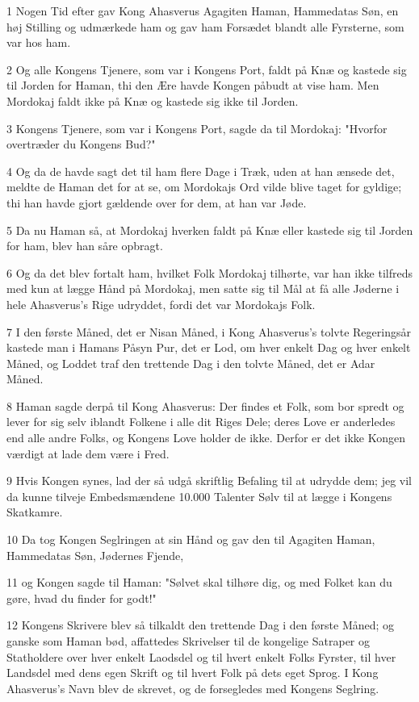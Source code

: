 \par 1 Nogen Tid efter gav Kong Ahasverus Agagiten Haman, Hammedatas Søn, en høj Stilling og udmærkede ham og gav ham Forsædet blandt alle Fyrsterne, som var hos ham.
\par 2 Og alle Kongens Tjenere, som var i Kongens Port, faldt på Knæ og kastede sig til Jorden for Haman, thi den Ære havde Kongen påbudt at vise ham. Men Mordokaj faldt ikke på Knæ og kastede sig ikke til Jorden.
\par 3 Kongens Tjenere, som var i Kongens Port, sagde da til Mordokaj: "Hvorfor overtræder du Kongens Bud?"
\par 4 Og da de havde sagt det til ham flere Dage i Træk, uden at han ænsede det, meldte de Haman det for at se, om Mordokajs Ord vilde blive taget for gyldige; thi han havde gjort gældende over for dem, at han var Jøde.
\par 5 Da nu Haman så, at Mordokaj hverken faldt på Knæ eller kastede sig til Jorden for ham, blev han såre opbragt.
\par 6 Og da det blev fortalt ham, hvilket Folk Mordokaj tilhørte, var han ikke tilfreds med kun at lægge Hånd på Mordokaj, men satte sig til Mål at få alle Jøderne i hele Ahasverus's Rige udryddet, fordi det var Mordokajs Folk.
\par 7 I den første Måned, det er Nisan Måned, i Kong Ahasverus's tolvte Regeringsår kastede man i Hamans Påsyn Pur, det er Lod, om hver enkelt Dag og hver enkelt Måned, og Loddet traf den trettende Dag i den tolvte Måned, det er Adar Måned.
\par 8 Haman sagde derpå til Kong Ahasverus: Der findes et Folk, som bor spredt og lever for sig selv iblandt Folkene i alle dit Riges Dele; deres Love er anderledes end alle andre Folks, og Kongens Love holder de ikke. Derfor er det ikke Kongen værdigt at lade dem være i Fred.
\par 9 Hvis Kongen synes, lad der så udgå skriftlig Befaling til at udrydde dem; jeg vil da kunne tilveje Embedsmændene 10.000 Talenter Sølv til at lægge i Kongens Skatkamre.
\par 10 Da tog Kongen Seglringen at sin Hånd og gav den til Agagiten Haman, Hammedatas Søn, Jødernes Fjende,
\par 11 og Kongen sagde til Haman: "Sølvet skal tilhøre dig, og med Folket kan du gøre, hvad du finder for godt!"
\par 12 Kongens Skrivere blev så tilkaldt den trettende Dag i den første Måned; og ganske som Haman bød, affattedes Skrivelser til de kongelige Satraper og Statholdere over hver enkelt Laodsdel og til hvert enkelt Folks Fyrster, til hver Landsdel med dens egen Skrift og til hvert Folk på dets eget Sprog. I Kong Ahasverus's Navn blev de skrevet, og de forsegledes med Kongens Seglring.
